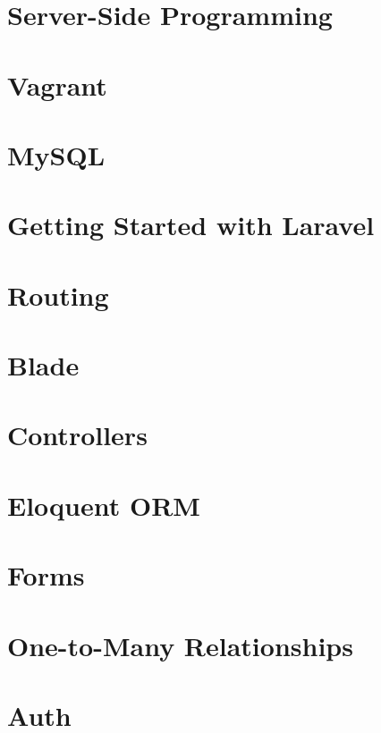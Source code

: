 \documentclass[b5paper,openany]{book}
\begin{document}
\tp


\tableofcontents




\chapter{Server-Side Programming}


\chapter{Vagrant}


\chapter{MySQL}


\chapter{Getting Started with Laravel}


\chapter{Routing}


\chapter{Blade}


\chapter{Controllers}


\chapter{Eloquent ORM}


\chapter{Forms}


\chapter{One-to-Many Relationships}


\chapter{Auth}








\end{document}
